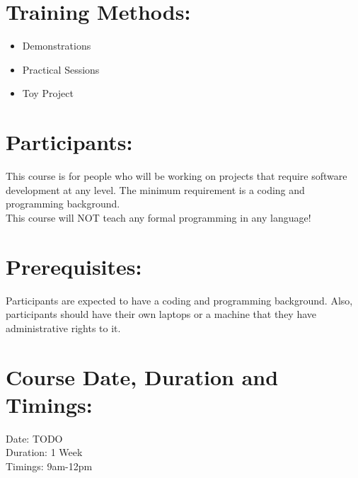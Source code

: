 \documentclass[a4paper,11pt]{article}
\begin{document}
\section{Training Methods:}
\begin{itemize}
	\item Demonstrations
	\item Practical Sessions
	\item Toy Project
\end{itemize}

\section{Participants:}
This course is for people who will be working on projects that require software development at any level.  The minimum requirement is a coding and programming background.\\
This course will NOT teach any formal programming in any language!

\section{Prerequisites:}
Participants are expected to have a coding and programming background. Also, participants should have their own laptops or a machine that they have administrative rights to it.

\section{Course Date, Duration and Timings:}
Date: TODO\\
Duration: 1 Week\\
Timings: 9am-12pm
\end{document}
